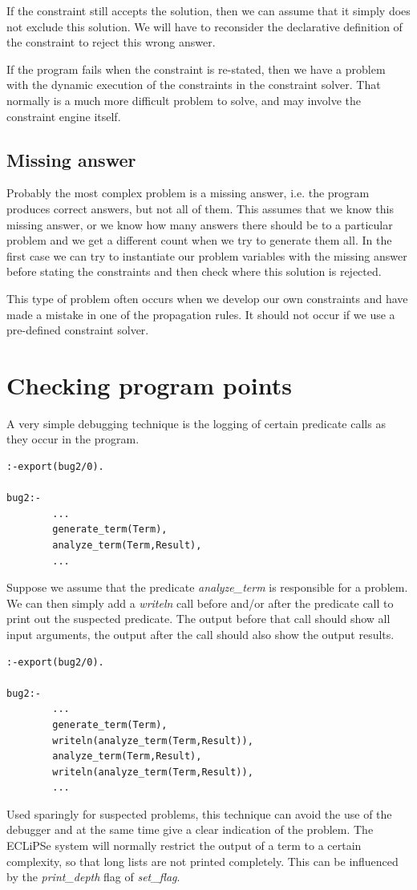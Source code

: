 \documentclass[a4paper,12pt]{report}
\begin{document}
If the constraint still accepts the solution, then we can assume that it simply does not exclude this solution. We will have to reconsider the declarative definition of the constraint to reject this wrong answer.

If the program fails when the constraint is re-stated, then we have a problem with the dynamic execution of the constraints in the constraint solver. That normally is a much more difficult problem to solve, and may involve the constraint engine itself.

\subsection{Missing answer} Probably the most complex problem is a missing answer, i.e. the program produces correct answers, but not all of them. This assumes that we know this missing answer, or we know how many answers there should be to a particular problem and we get a different count when we try to generate them all. In the first case we can try to instantiate our problem variables with the missing answer before stating the constraints and then check where this solution is rejected.

This type of problem often occurs when we develop our own constraints and have made a mistake in one of the propagation rules. It should not occur if we use a pre-defined constraint solver.

\section{Checking program points}
A very simple debugging technique is the logging of certain predicate calls as they occur in the program.
\begin{verbatim}
:-export(bug2/0).

bug2:-
        ...
        generate_term(Term),
        analyze_term(Term,Result),
        ...
\end{verbatim}
Suppose we assume that the predicate {\it analyze\_term} is responsible for a problem. We can then simply add a {\it writeln} call before and/or after the predicate call to print out the suspected predicate. The output before that call should show all input arguments, the output after the call should also show the output results.
\begin{verbatim}
:-export(bug2/0).

bug2:-
        ...
        generate_term(Term),
        writeln(analyze_term(Term,Result)),
        analyze_term(Term,Result),
        writeln(analyze_term(Term,Result)),
        ...
\end{verbatim}
Used sparingly for suspected problems, this technique can avoid the use of the debugger and at the same time give a clear indication of the problem. The ECLiPSe system will normally restrict the output of a term to a certain complexity, so that long lists are not printed completely. This can be influenced by the {\it print\_depth} flag of {\it set\_flag}.
\end{document}
